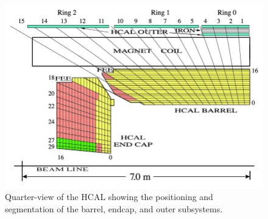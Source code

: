 \begin{figure}[htb]
\centering
  \includegraphics[width=0.7\linewidth]{plots/CMS/HCAL-quarter.png}
  \caption{Quarter-view of the HCAL showing the positioning and segmentation of the barrel, endcap, and outer subsystems.~\protect\cite{Chatrchyan:1223869}}
  \label{fig:cms:hcal}
\end{figure}